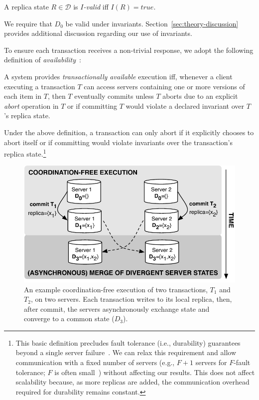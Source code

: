 \begin{definition}
A replica state $R \in {\mathcal D}$ is \textit{$I$-valid} iff $I(R) = true$.
\end{definition}

We require that $D_0$ be valid under
invariants. Section~\ref{sec:theory-discussion} provides additional discussion
regarding our use of invariants.


 To ensure each transaction receives a
non-trivial response,
we adopt the following definition of
\textit{availability}~\cite{hat-vldb}:

\begin{definition} 
\label{def:ta}
  A system provides \textit{transactionally available} execution iff,
  whenever a client executing a transaction $T$ can access servers
  containing one or more versions of each item in $T$, then $T$
  eventually commits unless $T$ aborts due to an explicit
  \textit{abort} operation in $T$ or if committing $T$ would violate
  a declared invariant over $T$'s replica state.
\end{definition}

Under the above definition, a transaction can only abort if it
explicitly chooses to abort itself or if committing would violate
invariants over the transaction's replica state.\footnote{This basic
  definition precludes fault tolerance (i.e., durability) guarantees
  beyond a single server failure~\cite{hat-vldb}. We can relax this
  requirement and allow communication with a fixed number of servers
  (e.g., $F+1$ servers for $F$-fault tolerance; $F$ is often
  small~\cite{dynamo}) without affecting our results. This does not
  affect scalability because, as more replicas are added, the
  communication overhead required for durability remains constant.}

\begin{figure}
\includegraphics[width=\figscale\columnwidth]{figs/replicas.pdf}\vspace{.5em}
\caption{An example coordination-free execution of two transactions,
  $T_1$ and $T_2$, on two servers. Each transaction writes to its
  local replica, then, after commit, the servers asynchronously
  exchange state and converge to a common state ($D_3$).}
\label{fig:replicas}
\end{figure}

